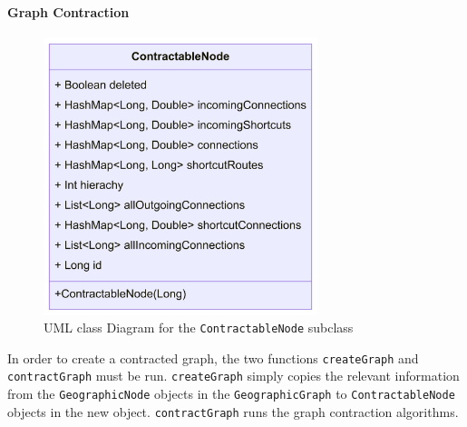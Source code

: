 \documentclass[11pt,twoside,a4paper]{article}
\begin{document}
\paragraph{Graph Contraction}
\begin{figure}[t]
\begin{center}
\includegraphics[width=8cm]{ContractableNode.png}
\end{center}
\caption{UML class Diagram for the \texttt{ContractableNode} subclass}
\label{ContractableNode}
\end{figure}
In order to create a contracted graph, the two functions \texttt{createGraph} and \texttt{contractGraph} must be run. \texttt{createGraph} simply copies the relevant information from the \texttt{GeographicNode} objects in the \texttt{GeographicGraph} to \texttt{ContractableNode} objects in the new object.
\texttt{contractGraph} runs the graph contraction algorithms.
\end{document}
